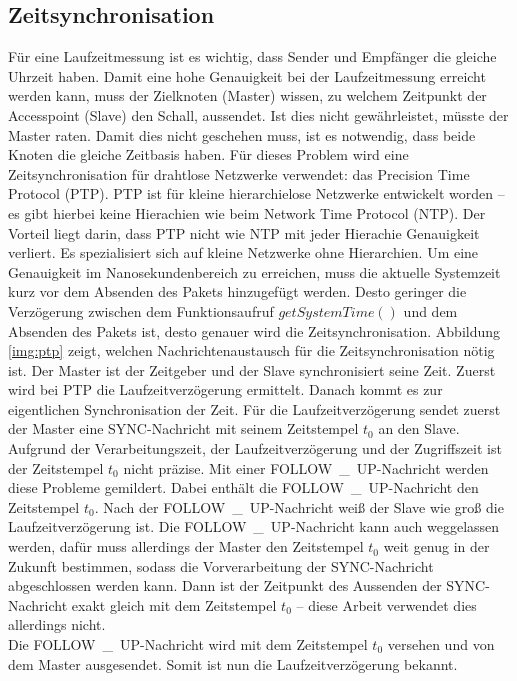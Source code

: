 \subsection{Zeitsynchronisation}
Für eine Laufzeitmessung ist es wichtig, dass Sender und Empfänger die gleiche Uhrzeit haben. Damit eine hohe Genauigkeit bei der Laufzeitmessung erreicht werden kann, muss der Zielknoten (Master) wissen, zu welchem Zeitpunkt der Accesspoint (Slave) den Schall, aussendet. Ist dies nicht gewährleistet, müsste der Master raten. Damit dies nicht geschehen muss, ist es notwendig, dass beide Knoten die gleiche Zeitbasis haben. Für dieses Problem wird eine Zeitsynchronisation für drahtlose Netzwerke verwendet: das Precision Time Protocol (PTP). PTP ist für kleine hierarchielose Netzwerke entwickelt worden -- es gibt hierbei keine Hierachien wie beim Network Time Protocol (NTP). Der Vorteil liegt darin, dass PTP nicht wie NTP mit jeder Hierachie Genauigkeit verliert. Es spezialisiert sich auf kleine Netzwerke ohne Hierarchien. Um eine Genauigkeit im Nanosekundenbereich zu erreichen, muss die aktuelle Systemzeit kurz vor dem Absenden des Pakets hinzugefügt werden. Desto geringer die Verzögerung zwischen dem Funktionsaufruf $getSystemTime()$ und dem Absenden des Pakets ist, desto genauer wird die Zeitsynchronisation. Abbildung \ref{img:ptp} zeigt, welchen Nachrichtenaustausch für die Zeitsynchronisation nötig ist. Der Master ist der Zeitgeber und der Slave synchronisiert seine Zeit. 
Zuerst wird bei PTP die Laufzeitverzögerung ermittelt. Danach kommt es zur eigentlichen Synchronisation der Zeit. Für die Laufzeitverzögerung sendet zuerst der Master eine \si{SYNC}-Nachricht mit seinem Zeitstempel $t_{0}$ an den Slave. Aufgrund der Verarbeitungszeit, der Laufzeitverzögerung und der Zugriffszeit ist der Zeitstempel $t_{0}$ nicht präzise. Mit einer \si{FOLLOW\_UP}-Nachricht werden diese Probleme gemildert. Dabei enthält die \si{FOLLOW\_UP}-Nachricht den Zeitstempel $t_{0}$. Nach der \si{FOLLOW\_UP}-Nachricht weiß der Slave wie groß die Laufzeitverzögerung ist. Die \si{FOLLOW\_UP}-Nachricht kann auch weggelassen werden, dafür muss allerdings der Master den Zeitstempel $t_{0}$ weit genug in der Zukunft bestimmen, sodass die Vorverarbeitung der \si{SYNC}-Nachricht abgeschlossen werden kann. Dann ist der Zeitpunkt des Aussenden der \si{SYNC}-Nachricht exakt gleich mit dem Zeitstempel $t_{0}$ -- diese Arbeit verwendet dies allerdings nicht.
\\
Die \si{FOLLOW\_UP}-Nachricht wird mit dem Zeitstempel $t_{0}$ versehen und von dem Master ausgesendet. Somit ist nun die Laufzeitverzögerung bekannt.
